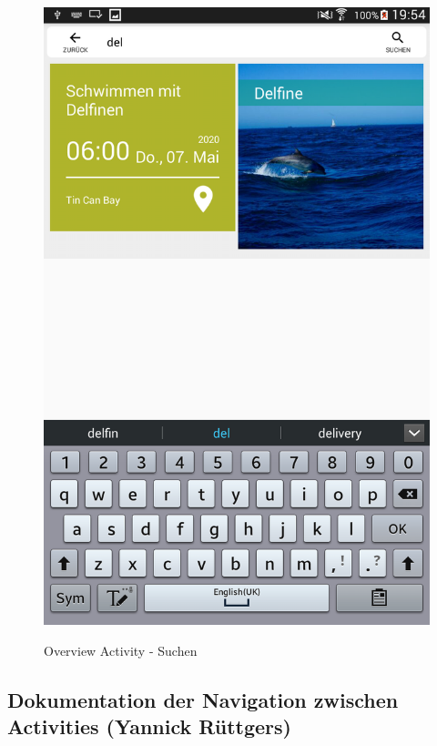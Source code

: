 \begin{figure}[H]
\centering
\begin{minipage}[t]{1\textwidth} %
\caption{Overview Activity - Suchen} %
\includegraphics[width=1\textwidth]{img/Suchen}\\ %
\end{minipage}
\end{figure}

\subsection{Dokumentation der Navigation zwischen Activities (Yannick Rüttgers)}


